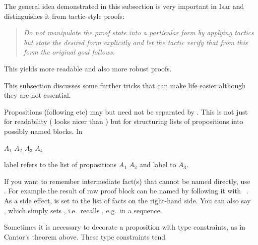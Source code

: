 \begin{isabellebody}
\begin{isamarkuptext}
The general idea demonstrated in this subsection is very
important in Isar and distinguishes it from tactic-style proofs:
\begin{quote}\em
Do not manipulate the proof state into a particular form by applying
tactics but state the desired form explicitly and let the tactic verify
that from this form the original goal follows.
\end{quote}
This yields more readable and also more robust proofs.%
\end{isamarkuptext}%
\isamarkuptrue%
%
\isamarkuptrue%
%
\begin{isamarkuptext}%
This subsection discusses some further tricks that can make
life easier although they are not essential.%
\end{isamarkuptext}%
\isamarkuptrue%
%
\isamarkuptrue%
%
\begin{isamarkuptext}%
Propositions (following  etc) may but need not be
separated by . This is not just for readability
(    looks nicer than
  ) but for structuring lists of propositions
into possibly named blocks. In
\begin{center}
  $A_1$ $A_2$   $A_3$
 $A_4$
\end{center}
label  refers to the list of propositions $A_1$ $A_2$ and
label  to $A_3$.%
\end{isamarkuptext}%
\isamarkuptrue%
%
\isamarkuptrue%
%
\begin{isamarkuptext}%
If you want to remember intermediate fact(s) that cannot be
named directly, use . For example the result of raw
proof block can be named by following it with
~.  As a side effect,
 is set to the list of facts on the right-hand side. You
can also say , which simply sets ,
i.e.\ recalls , e.g.\ in a  sequence.%
\end{isamarkuptext}%
\isamarkuptrue%
%
\isamarkuptrue%
%
\begin{isamarkuptext}%
Sometimes it is necessary to decorate a proposition with type
constraints, as in Cantor's theorem above. These type constraints tend

\end{isamarkuptext}
\end{isabellebody}
